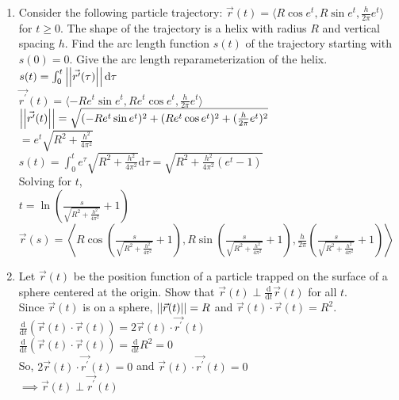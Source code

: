 \begin{enumerate}
	\item Consider the following particle trajectory: $\vec{r}(t)=\langle R\cos{e^t},R\sin{e^t},\frac{h}{2\pi}e^t\rangle$ for $t\geq 0$. The shape of the trajectory is a helix with radius $R$ and vertical spacing $h$. Find the arc length function $s(t)$ of the trajectory starting with $s(0)=0$. Give the arc length reparameterization of the helix.\\
	\indent
	$s(t)=\int_{0}^{t}{\left|\left|\vec{r^\prime}(\tau)\right|\right|\mathrm{d}\tau}$\\
	$\vec{r^\prime}(t)=\langle -Re^{t}\sin{e^t},Re^{t}\cos{e^t},\frac{h}{2\pi}e^{t}\rangle$\\
	$\left|\left|\vec{r^\prime}(t)\right|\right|=\sqrt{(-Re^{t}\sin{e^t})^2+(Re^{t}\cos{e^t})^2+(\frac{h}{2\pi}e^t)^2}$\\
	$=e^{t}\sqrt{R^2+\frac{h^2}{4\pi^2}}$\\
	$s(t)=\int_{0}^{t}{e^{\tau}\sqrt{R^2+\frac{h^2}{4\pi^2}}\mathrm{d}\tau}=\sqrt{R^2+\frac{h^2}{4\pi^2}(e^{t}-1)}$\\
	Solving for $t$,\\
	$t=\ln{\left(\frac{s}{\sqrt{R^2+\frac{h^2}{4\pi^2}}}+1\right)}$\\
	$\vec{r}(s)=\left<R\cos{\left(\frac{s}{\sqrt{R^2+\frac{h^2}{4\pi^2}}}+1\right)},R\sin{\left(\frac{s}{\sqrt{R^2+\frac{h^2}{4\pi^2}}}+1\right)},\frac{h}{2\pi}\left(\frac{s}{\sqrt{R^2+\frac{h^2}{4\pi^2}}}+1\right)\right>$\\
	
	\item Let $\vec{r}(t)$ be the position function of a particle trapped on the surface of a sphere centered at the origin. Show that $\vec{r}(t)\perp\frac{\mathrm{d}}{\mathrm{d}t}\vec{r}(t)$ for all $t$.\\
	\indent
	Since $\vec{r}(t)$ is on a sphere, $\left|\left|\vec{r}(t)\right|\right|=R$ and $\vec{r}(t)\cdot\vec{r}(t)=R^2$.\\
	$\frac{\mathrm{d}}{\mathrm{d}t}(\vec{r}(t)\cdot\vec{r}(t))=2\vec{r}(t)\cdot\vec{r^\prime}(t)$\\
	$\frac{\mathrm{d}}{\mathrm{d}t}(\vec{r}(t)\cdot\vec{r}(t))=\frac{\mathrm{d}}{\mathrm{d}t}R^2=0$\\
	So, $2\vec{r}(t)\cdot\vec{r^\prime}(t)=0$ and $\vec{r}(t)\cdot\vec{r^\prime}(t)=0$\\
	$\implies\vec{r}(t)\perp\vec{r^\prime}(t)$\\
\end{enumerate}